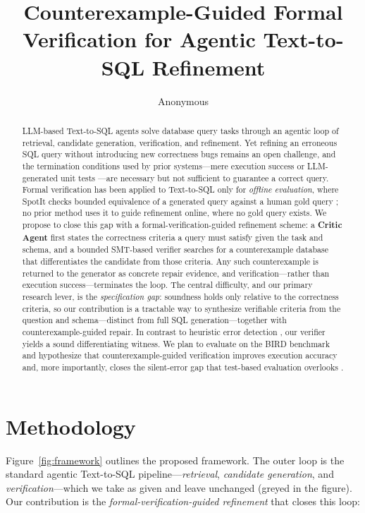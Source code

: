 \documentclass{article}
\title{Counterexample-Guided Formal Verification for Agentic Text-to-SQL Refinement}
\author{Anonymous}
\begin{document}
\maketitle

\begin{abstract}
LLM-based Text-to-SQL agents solve database query tasks through an agentic loop of
retrieval, candidate generation, verification, and refinement. Yet refining an
erroneous SQL query without introducing new correctness bugs remains an open
challenge, and the termination conditions used by prior systems---mere execution
success \cite{wang2023macsql} or LLM-generated unit tests \cite{talaei2024chess}---are
necessary but not sufficient to guarantee a correct query. Formal verification has
been applied to Text-to-SQL only for \emph{offline evaluation}, where SpotIt checks
bounded equivalence of a generated query against a human gold query
\cite{klopfenstein2026spotit}; no prior method uses it to guide refinement online,
where no gold query exists. We propose to close this gap with a
formal-verification-guided refinement scheme: a \textbf{Critic Agent} first states
the correctness criteria a query must satisfy given the task and schema, and a
bounded SMT-based verifier searches for a counterexample database that
differentiates the candidate from those criteria. Any such counterexample is
returned to the generator as concrete repair evidence, and verification---rather than
execution success---terminates the loop. The central difficulty, and our primary
research lever, is the \emph{specification gap}: soundness holds only relative to the
correctness criteria, so our contribution is a tractable way to synthesize
verifiable criteria from the question and schema---distinct from full SQL
generation---together with counterexample-guided repair. In contrast to
heuristic error detection \cite{hong26errorllm}, our verifier yields a sound
differentiating witness. We plan to evaluate on the BIRD benchmark
\cite{li2023bird} and hypothesize that counterexample-guided verification improves
execution accuracy and, more importantly, closes the silent-error gap that
test-based evaluation overlooks \cite{klopfenstein2026spotit}.
\end{abstract}

\section{Methodology}

Figure~\ref{fig:framework} outlines the proposed framework. The outer loop is the
standard agentic Text-to-SQL pipeline---\emph{retrieval}, \emph{candidate
generation}, and \emph{verification}---which we take as given and leave unchanged
(greyed in the figure). Our contribution is the
\emph{formal-verification-guided refinement} that closes this loop:
\end{document}
